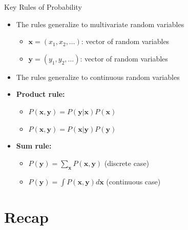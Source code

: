 \documentclass{beamer}
\begin{document}
\begin{frame}{Key Rules of Probability}
  \begin{itemize}
  \item The rules generalize to multivariate random variables
    \begin{itemize}
      \item $\mathbf{x} = (x_1, x_2, \ldots)$: vector of random variables
      \item $\mathbf{y} = (y_1, y_2, \ldots)$: vector of random variables
      \end{itemize}
    \item The rules generalize to continuous random variables

    \item \textbf{Product rule:}
      \begin{itemize}
      \item $P(\mathbf{x}, \mathbf{y}) = P(\mathbf{y}|\mathbf{x})P(\mathbf{x})$
      \item $P(\mathbf{x}, \mathbf{y}) = P(\mathbf{x}|\mathbf{y})P(\mathbf{y})$
      \end{itemize}
    \item \textbf{Sum rule:}
      \begin{itemize}
      \item $P(\mathbf{y}) = \sum_{\mathbf{x}} P(\mathbf{x}, \mathbf{y})$ (discrete case)
      \item $P(\mathbf{y}) = \int P(\mathbf{x}, \mathbf{y}) d\mathbf{x}$ (continuous case)
      \end{itemize}
    \end{itemize}
\end{frame}

\section{Recap}
\end{document}
